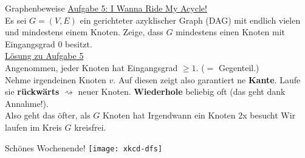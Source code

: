 \begin{frame}{Graphenbeweise}
	\underline{Aufgabe 5: I Wanna Ride My Acycle!} \\
	Es sei $G = (V, E)$ ein gerichteter azyklischer Graph (DAG) mit endlich vielen und mindestens einem Knoten. Zeige, dass $G$ mindestens einen Knoten mit Eingangsgrad 0 besitzt. \\
	\pause
	\forcenewline
	\underline{Lösung zu Aufgabe 5} \\
	Angenommen, jeder Knoten hat Eingangsgrad $\geq 1$. ($=$ Gegenteil.) \\ 
	Nehme irgendeinen Knoten $v$. Auf diesen zeigt also garantiert ne \textbf{Kante}. Laufe sie \textbf{rückwärts} $\rightsquigarrow$ neuer Knoten. \textbf{Wiederhole} beliebig oft (das geht dank Annahme!). \\
	Also geht das öfter, als $G$ Knoten hat \impl Irgendwann ein Knoten 2x besucht \impl Wir laufen im Kreis \impl \crash $G$ kreisfrei. 
\end{frame}

\begin{frame}{Schönes Wochenende! \smiley}
	\centering
	\texttt{[image: xkcd-dfs]}
\end{frame}


